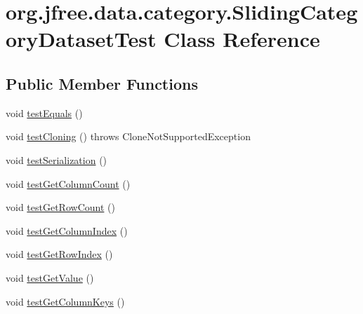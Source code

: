 \hypertarget{classorg_1_1jfree_1_1data_1_1category_1_1_sliding_category_dataset_test}{}\section{org.\+jfree.\+data.\+category.\+Sliding\+Category\+Dataset\+Test Class Reference}
\label{classorg_1_1jfree_1_1data_1_1category_1_1_sliding_category_dataset_test}
\subsection*{Public Member Functions}
\begin{DoxyCompactItemize}
\item 
void \mbox{\hyperlink{classorg_1_1jfree_1_1data_1_1category_1_1_sliding_category_dataset_test_afa264eb6ced7cff74d8793bccaba0f66}{test\+Equals}} ()
\item 
void \mbox{\hyperlink{classorg_1_1jfree_1_1data_1_1category_1_1_sliding_category_dataset_test_a25538cb409e870e6153740c343fbe9d2}{test\+Cloning}} ()  throws Clone\+Not\+Supported\+Exception 
\item 
void \mbox{\hyperlink{classorg_1_1jfree_1_1data_1_1category_1_1_sliding_category_dataset_test_ab4c09bd733b65ffd45315390ade7e1ac}{test\+Serialization}} ()
\item 
void \mbox{\hyperlink{classorg_1_1jfree_1_1data_1_1category_1_1_sliding_category_dataset_test_a914f30b29f611da9f45d41be72185047}{test\+Get\+Column\+Count}} ()
\item 
void \mbox{\hyperlink{classorg_1_1jfree_1_1data_1_1category_1_1_sliding_category_dataset_test_a8ff660c36971acfec59e6560db7879c7}{test\+Get\+Row\+Count}} ()
\item 
void \mbox{\hyperlink{classorg_1_1jfree_1_1data_1_1category_1_1_sliding_category_dataset_test_a7cefebc58642d963f32c71f37ee3dd41}{test\+Get\+Column\+Index}} ()
\item 
void \mbox{\hyperlink{classorg_1_1jfree_1_1data_1_1category_1_1_sliding_category_dataset_test_a8e0437c428766eb42dedd8ecaf8d1366}{test\+Get\+Row\+Index}} ()
\item 
void \mbox{\hyperlink{classorg_1_1jfree_1_1data_1_1category_1_1_sliding_category_dataset_test_ab1a842dffd4468864702a879ed0ef2a3}{test\+Get\+Value}} ()
\item 
void \mbox{\hyperlink{classorg_1_1jfree_1_1data_1_1category_1_1_sliding_category_dataset_test_a22c5679f472b76dac023b8f61ee01c68}{test\+Get\+Column\+Keys}} ()
\end{DoxyCompactItemize}


